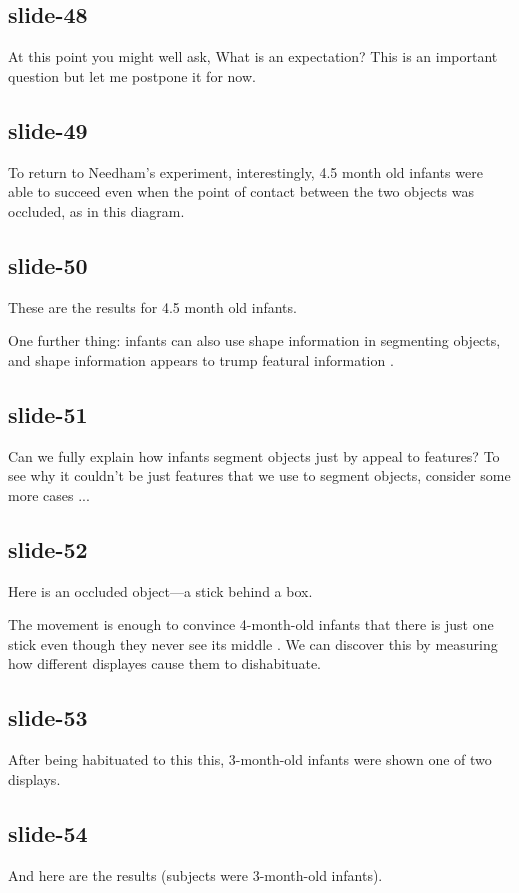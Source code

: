 \documentclass[12pt,\papersize]{extarticle}
\begin{document}
\subsection{slide-48}
At this point you might well ask, What is an expectation?
This is an important question but let me postpone it for now.
 
\subsection{slide-49}
To return to Needham's experiment, interestingly, 4.5 month old infants were able to succeed 
even when the point of contact between the two objects was occluded, as in this diagram.
 
\subsection{slide-50}
These are the results for 4.5 month old infants.
 
One further thing: infants can also use shape information in segmenting objects, and shape information appears to trump featural information \citep{needham:1999_role}.
 
\subsection{slide-51}
Can we fully explain how infants segment objects just by appeal to features?
To see why it couldn't be just features that we use to segment objects, consider 
some more cases ...
 
\subsection{slide-52}
Here is an occluded object---a stick behind a box.
 
The movement is enough to convince 4-month-old infants that there is just one stick even 
though they never see its middle \citep{kellman:1983_perception}.
We can discover this by measuring how different displayes cause them to dishabituate.
 
\subsection{slide-53}
After being habituated to this this, 3-month-old infants were shown one of two displays.
 
\subsection{slide-54}
And here are the results (subjects were 3-month-old infants).
 
\end{document}
